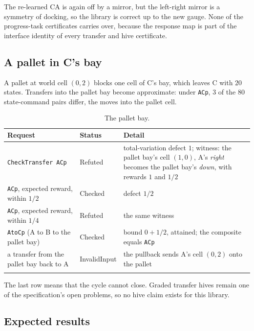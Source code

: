 \documentclass[11pt]{article}
\newcommand{\code}[1]{\texttt{#1}}
\theoremstyle{definition}
\theoremstyle{plain}
\begin{document}
The re-learned CA is again off by a mirror, but the left-right mirror is a symmetry of docking, so the
library is correct up to the new gauge. None of the progress-task certificates carries over, because
the response map is part of the interface identity of every transfer and hive certificate.

\subsection{A pallet in C's bay}\label{sec:ex3pallet}

A pallet at world cell $(0,2)$ blocks one cell of C's bay, which leaves C with $20$ states. Transfers
into the pallet bay become approximate: under \code{ACp}, $3$ of the $80$ state-command pairs differ,
the moves into the pallet cell.

\begin{longtable}{>{\raggedright\arraybackslash}p{4.2cm}l>{\raggedright\arraybackslash}p{7.6cm}}
\toprule
Request & Status & Detail\\
\midrule
\endhead
\code{CheckTransfer ACp} & Refuted & total-variation defect $1$; witness: the pallet bay's cell $(1,0)$, A's \emph{right} becomes the pallet bay's \emph{down}, with rewards $1$ and $1/2$\\
\code{ACp}, expected reward, within $1/2$ & Checked & defect $1/2$\\
\code{ACp}, expected reward, within $1/4$ & Refuted & the same witness\\
\code{AtoCp} (A to B to the pallet bay) & Checked & bound $0+1/2$, attained; the composite equals \code{ACp}\\
a transfer from the pallet bay back to A & InvalidInput & the pullback sends A's cell $(0,2)$ onto the pallet\\
\bottomrule
\caption{The pallet bay.}\label{tab:ex3pallet}
\end{longtable}

The last row means that the cycle cannot close. Graded transfer hives remain one of the
specification's open problems, so no hive claim exists for this library.

\subsection{Expected results}
\end{document}
